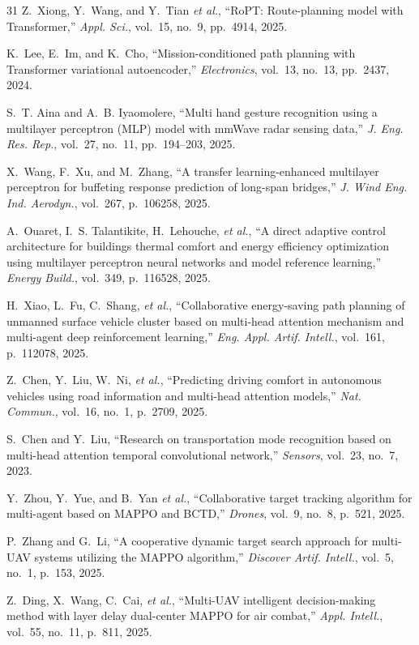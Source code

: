 \documentclass[conference]{IEEEtran}
\newcommand{\etal}{\textit{et al.}}
\begin{document}
\begin{thebibliography}{31}
Z.~Xiong, Y.~Wang, and Y.~Tian \etal,
``RoPT: Route-planning model with Transformer,''
\emph{Appl. Sci.}, vol.~15, no.~9, pp.~4914, 2025.

K.~Lee, E.~Im, and K.~Cho,
``Mission-conditioned path planning with Transformer variational
autoencoder,''
\emph{Electronics}, vol.~13, no.~13, pp.~2437, 2024.

S.~T. Aina and A.~B. Iyaomolere,
``Multi hand gesture recognition using a multilayer perceptron
(MLP) model with mmWave radar sensing data,''
\emph{J. Eng. Res. Rep.}, vol.~27, no.~11, pp.~194--203, 2025.

X.~Wang, F.~Xu, and M.~Zhang,
``A transfer learning-enhanced multilayer perceptron for buffeting
response prediction of long-span bridges,''
\emph{J. Wind Eng. Ind. Aerodyn.}, vol.~267, p.~106258, 2025.

A.~Ouaret, I.~S. Talantikite, H.~Lehouche, \etal,
``A direct adaptive control architecture for buildings thermal
comfort and energy efficiency optimization using multilayer
perceptron neural networks and model reference learning,''
\emph{Energy Build.}, vol.~349, p.~116528, 2025.

H.~Xiao, L.~Fu, C.~Shang, \etal,
``Collaborative energy-saving path planning of unmanned surface
vehicle cluster based on multi-head attention mechanism and
multi-agent deep reinforcement learning,''
\emph{Eng. Appl. Artif. Intell.}, vol.~161, p.~112078, 2025.

Z.~Chen, Y.~Liu, W.~Ni, \etal,
``Predicting driving comfort in autonomous vehicles using road
information and multi-head attention models,''
\emph{Nat. Commun.}, vol.~16, no.~1, p.~2709, 2025.

S.~Chen and Y.~Liu,
``Research on transportation mode recognition based on multi-head
attention temporal convolutional network,''
\emph{Sensors}, vol.~23, no.~7, 2023.

Y.~Zhou, Y.~Yue, and B.~Yan \etal,
``Collaborative target tracking algorithm for multi-agent based
on MAPPO and BCTD,''
\emph{Drones}, vol.~9, no.~8, p.~521, 2025.

P.~Zhang and G.~Li,
``A cooperative dynamic target search approach for multi-UAV
systems utilizing the MAPPO algorithm,''
\emph{Discover Artif. Intell.}, vol.~5, no.~1, p.~153, 2025.

Z.~Ding, X.~Wang, C.~Cai, \etal,
``Multi-UAV intelligent decision-making method with layer delay
dual-center MAPPO for air combat,''
\emph{Appl. Intell.}, vol.~55, no.~11, p.~811, 2025.

\end{thebibliography}
\end{document}
